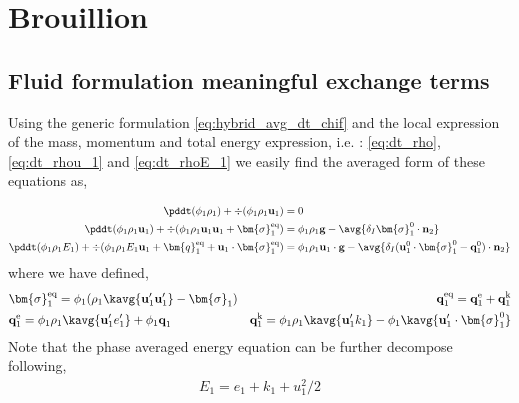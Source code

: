 \section{Brouillion}
\subsection*{Fluid formulation meaningful exchange terms}


Using the generic formulation \ref{eq:hybrid_avg_dt_chif} and the local expression of the mass, momentum and total energy expression, i.e. : \ref{eq:dt_rho},\ref{eq:dt_rhou_1} and \ref{eq:dt_rhoE_1} we easily find the averaged form of these equations as, 

\begin{align}
    \label{eq:dt_avg_rho}
    \pddt (\phi_1 \rho_1)  
    + \div (
        \phi_1 \rho_1\textbf{u}_1
    )
    &= 
    0\\
    \label{eq:dt_avg_rhou_1}
    \pddt (\phi_1 \rho_1\textbf{u}_1)  
    + \div (
        \phi_1 \rho_1\textbf{u}_1\textbf{u}_1
        + \bm{\sigma}_1^\text{eq}
    )
    &= 
    \phi_1 \rho_1 \textbf{g} 
    -  \avg{\delta_I \bm{\sigma}_1^0 \cdot \textbf{n}_2}\\
    \label{eq:dt_avg_rhoE_1}
    \pddt (\phi_1\rho_1E_1)  
    + \div (
        \phi_1\rho_1E_1\textbf{u}_1
        + \bm{q}_1^\text{eq}
        + \textbf{u}_1 \cdot \bm{\sigma}_1^\text{eq}
        )
    &= 
    \phi_1 \rho_1\textbf{u}_1 \cdot \textbf{g} 
    - \avg{\delta_I (\textbf{u}_1^0 \cdot \bm{\sigma}_1^0 - \textbf{q}_1^0)\cdot \textbf{n}_2}
\end{align} 
where we have defined, 
\begin{align*}
    &\bm{\sigma}_1^\text{eq}
    = \phi_1 (
        \rho_1\kavg{\textbf{u}_1'\textbf{u}_1'}
        - \bm{\sigma}_1%
         )  
    &\textbf{q}_1^\text{eq}
    =\textbf{q}_1^\text{e} +\textbf{q}_1^\text{k}  \\
    &\textbf{q}_1^\text{e}
    = \phi_1\rho_1 \kavg{\textbf{u}_1' e_1'} 
    + \phi_1\textbf{q}_1 
    &\textbf{q}_1^\text{k}
    = \phi_1\rho_1 \kavg{\textbf{u}_1' k_1} 
    - \phi_1\kavg{\textbf{u}_1' \cdot \bm{\sigma}_1^0}
\end{align*}
Note that the phase averaged energy equation can be further decompose following, 
\begin{align*}
    E_1 = e_1 + k_1 + u_1^2/2
    \label{eq:E_def}
\end{align*}
